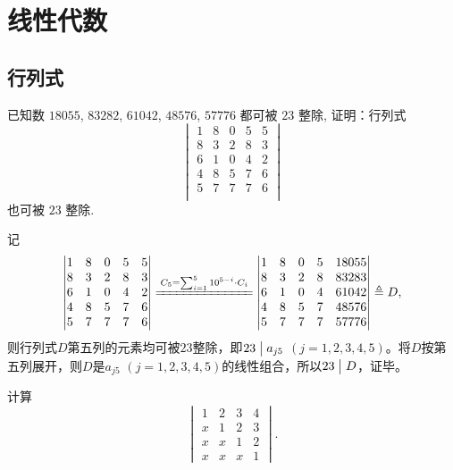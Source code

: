 \section{线性代数}

\subsection{行列式}
\begin{exercise}
	已知数 $18055$, $83282$, $61042$, $48576$, $57776$ 都可被 $23$ 整除, 证明：行列式
	\[\begin{vmatrix}
    	1 & 8 & 0 & 5 & 5 \\
    	8 & 3 & 2 & 8 & 3 \\
    	6 & 1 & 0 & 4 & 2 \\
    	4 & 8 & 5 & 7 & 6 \\
    	5 & 7 & 7 & 7 & 6 \\
	\end{vmatrix}\]
	也可被 $23$ 整除.
\end{exercise}

\begin{proofs}
	记
    \[
        \begin{vmatrix}
            1 & 8 & 0 & 5 & 5 \\
            8 & 3 & 2 & 8 & 3 \\
            6 & 1 & 0 & 4 & 2 \\
            4 & 8 & 5 & 7 & 6 \\
            5 & 7 & 7 & 7 & 6 \\
        \end{vmatrix}
        \xlongequal{C_5=\sum_{i=1}^{5}10^{5-i}\cdot C_i}
        \begin{vmatrix}
            1 & 8 & 0 & 5 & 18055 \\
            8 & 3 & 2 & 8 & 83283 \\
            6 & 1 & 0 & 4 & 61042 \\
            4 & 8 & 5 & 7 & 48576 \\
            5 & 7 & 7 & 7 & 57776 \\
        \end{vmatrix}
        \triangleq D,
    \]
    则行列式$D$第五列的元素均可被$23$整除，即$23\bigm| a_{j5}$ $(j=1,2,3,4,5)$。将$D$按第五列展开，则$D$是$a_{j5}$ $(j=1,2,3,4,5)$的线性组合，所以$23 \bigm| D$，证毕。
\end{proofs}

\begin{exercise} \label{ex:vec:123x}
    计算
    \[
    \begin{vmatrix}
    1 & 2 & 3 & 4 \\
    x & 1 & 2 & 3 \\
    x & x & 1 & 2 \\
    x & x & x & 1
    \end{vmatrix}.
    \]
\end{exercise}

